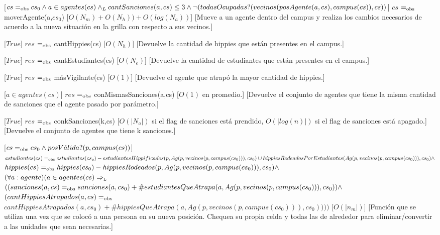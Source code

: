 \begin{Interfaz}
   [$cs =_{\mathrm{obs}} cs_{0} \land a \in agentes(cs) \land_{L} cantSanciones(a,cs) \leq 3  \land \neg(todasOcupadas?(vecinos (posAgente(a,cs), campus(cs)),cs))$]
   {$cs$ $=_{\mathrm{obs}}$ moverAgente(a,$cs_{0}$)}
   [$O(N_{m}) + O(N_{h}))+ O(log(N_{a}))$]
   [Mueve a un agente dentro del campus y realiza los cambios necesarios de acuerdo a la nueva situaci\'on en la grilla con respecto a sus vecinos.]
  

   [$True$]
   {$res$ $=_{\mathrm{obs}}$ cantHippies(cs)}
   [$O(N_{h})$]
   [Devuelve la cantidad de hippies que están presentes en el campus.]  

   [$True$]
   {$res$ $=_{\mathrm{obs}}$ cantEstudiantes(cs)}
   [$O(N_{e})$]
   [Devuelve la cantidad de estudiantes que están presentes en el campus.]  

   [$True$]
   {$res$ $=_{\mathrm{obs}}$ másVigilante(cs)}
   [$O(1)$]
   [Devuelve el agente que atrap\'o la mayor cantidad de hippies.]  

   [$a \in agentes(cs)$]
   {$res$ $=_{\mathrm{obs}}$ conMismasSanciones(a,cs)}
   [$O(1)$ en promedio.]
   [Devuelve el conjunto de agentes que tiene la misma cantidad de sanciones que el agente pasado por parámetro.]  

   [$True$]
   {$res$ $=_{\mathrm{obs}}$ conkSanciones(k,cs)}
   [$O(|N_{a}|)$ si el flag de sanciones está prendido, $O(|log(n)|)$ si el flag de sanciones está apagado.]
   [Devuelve el conjunto de agentes que tiene k sanciones.]


   [$cs =_{\mathrm{obs}} cs_{0} \land posV\acute{a}lida?(p,campus(cs))$]
   {$estudiantes(cs) =_{\mathrm{obs}} estudiantes(cs_{o}) - estudiantesHippificados(p,Ag(p,vecinos(p,campus(cs_{0}))),cs_{0}) \cup hippiesRodeadosPorEstudiantes(Ag(p,vecinos(p,campus(cs_{0}))),cs_{0}) \land$ \\
$hippies(cs) =_{\mathrm{obs}} hippies(cs_{0}) - hippiesRodeados(p,Ag(p,vecinos(p,campus(cs_{0}))),cs_{0}) \land$ \\
$(\forall a: agente) (a \in agentes(cs) \Rightarrow_{\mathrm{\scriptscriptstyle{L}}}$ \\ $((sanciones(a,cs) =_{\mathrm{obs}} sanciones(a,cs_{0}) + \#estudiantesQueAtrapa(a,Ag(p,vecinos(p,campus(cs_{0}))),cs_{0})) \land $ \\
$(cantHippiesAtrapados(a,cs) =_{\mathrm{obs}}$ \\ $cantHippiesAtrapados(a,cs_{0}) + \#hippiesQueAtrapa(a,Ag(p,vecinos(p,campus(cs_{0}))),cs_{0}))))$}
   [$O(|n_{m}|)$]
   [Funci\'on que se utiliza una vez que se coloc\'o a una persona en su nueva posici\'on. Chequea su propia celda y todas las de alrededor para eliminar/convertir a las unidades que sean necesarias.]


\end{Interfaz}
